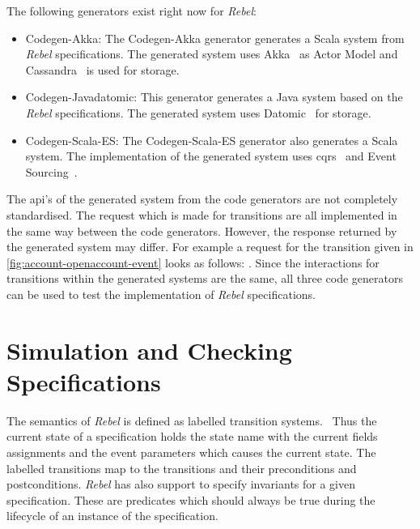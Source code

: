 The following generators exist right now for \textit{Rebel}:
\begin{itemize}

\item Codegen-Akka: The Codegen-Akka generator generates a Scala system from
\textit{Rebel} specifications. The generated system uses
Akka~\cite[p.~4]{roestenburg2016akka} as Actor Model and
Cassandra~\cite{lakshman2010cassandra} is used for storage.

\item Codegen-Javadatomic: This generator generates a Java system based on the
\textit{Rebel} specifications. The generated system uses
Datomic~\cite[p.~170-172]{anderson2016professional} for storage.

\item Codegen-Scala-ES: The Codegen-Scala-ES generator also generates a Scala
system. The implementation of the generated system uses
\gls{cqrs}~\cite{fowler2011cqrs} and Event Sourcing~\cite{fowler2005event}.

\end{itemize}

The \gls{api}'s of the generated system from the code generators are not completely
standardised. The request which is made for transitions are all implemented in
the same way between the code generators. However, the response returned by the
generated system may differ. For example a request for the transition given in
\autoref{fig:account-openaccount-event} looks as follows:
. Since the
interactions for transitions within the generated systems are the same, all
three code generators can be used to test the implementation of \textit{Rebel}
specifications.

\section{Simulation and Checking Specifications}


The semantics of \textit{Rebel} is defined as labelled transition
systems.~\cite[p.~5]{stoel_storm_vinju_bosman_2016} Thus the current state of a
specification holds the state name with the current fields assignments and the
event parameters which causes the current state. The labelled transitions map
to the transitions and their preconditions and postconditions. \textit{Rebel} has
also support to specify invariants for a given specification. These are
predicates which should always be true during the lifecycle of an instance of
the specification.

